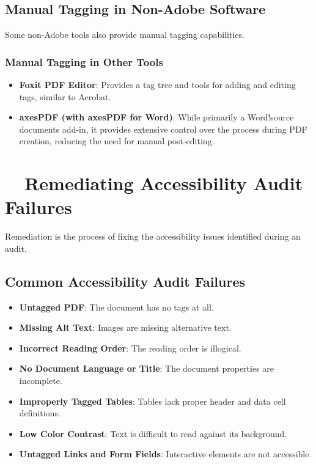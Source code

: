 \subsection{Manual Tagging in Non-Adobe Software}
\label{subsec:manual-tagging-non-adobe}
Some non-Adobe tools also provide manual tagging capabilities.

\subsubsection{Manual Tagging in Other Tools}
\label{ssubsec:manual-tagging-other-tools}
\begin{itemize}
	\item \textbf{Foxit PDF Editor}: Provides a tag tree and tools for adding and editing tags, similar to Acrobat.
	\item \textbf{axesPDF (with axesPDF for Word)}: While primarily a Word!source documents add-in, it provides extensive control over the process during PDF creation, reducing the need for manual post-editing.
\end{itemize}

\section{~~Remediating Accessibility Audit Failures}
\label{sec:remediating-audit-failures}
Remediation is the process of fixing the accessibility issues identified during an audit.

\subsection{Common Accessibility Audit Failures}
\label{subsec:common-audit-failures}
\begin{itemize}
	\item \textbf{Untagged PDF}: The document has no tags at all.
	\item \textbf{Missing Alt Text}: Images are missing alternative text.
	\item \textbf{Incorrect Reading Order}: The reading order is illogical.
	\item \textbf{No Document Language or Title}: The document properties are incomplete.
	\item \textbf{Improperly Tagged Tables}: Tables lack proper header and data cell definitions.
	\item \textbf{Low Color Contrast}: Text is difficult to read against its background.
	\item \textbf{Untagged Links and Form Fields}: Interactive elements are not accessible.
\end{itemize}


